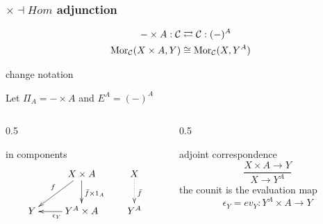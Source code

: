 \begin{frame}[t]
\frametitle{$\times \dashv Hom$ adjunction}
\begin{block}{}
\abovedisplayskip=0pt
\begin{align*}
- \times A: \mathcal{C} & \rightleftarrows \mathcal{C}: (-)^A\\
\mathop{\rm Mor}\nolimits_{\mathcal{C}}(X \times A, Y) & \cong  \mathop{\rm Mor}\nolimits_{\mathcal{C}}(X, Y^A)
\end{align*}
\end{block}
\begin{block}{change notation}
	\begin{center}
	Let $\Pi_A = - \times A$ and $E^A = (-)^A$
	\end{center}
\end{block}
\begin{columns}[t]
    \begin{column}{0.5\framewidth}
\begin{block}{in components}
			$$
			\xymatrix{
			& X \times A \ar[d]^{\bar{f} \times 1_A} \ar[dl]_{f} & X \ar@{.>}[d]^{\bar{f}}\\
			Y & Y^A \times A \ar[l]^{\epsilon_Y} & Y^A}
			$$
		\end{block}
    \end{column}
    \begin{column}{0.5\framewidth}
		\begin{block}{adjoint correspondence}
		\abovedisplayskip=0pt
		$$
			\frac{X \times A \longrightarrow Y}{X \longrightarrow Y^A}
		$$
		the counit is the evaluation map
		$$
			\epsilon_Y = ev_Y \colon Y^A \times A \longrightarrow Y
		$$
		\end{block}		
    \end{column}
\end{columns}
\end{frame}